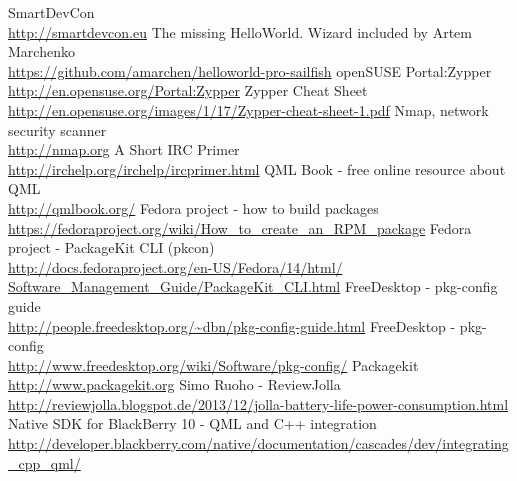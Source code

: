 \begin{thebibliography}{xxxxxxxxxxxx}
%
%
 SmartDevCon \\\url{http://smartdevcon.eu}
%
%
 The missing HelloWorld. Wizard included by Artem Marchenko \\\url{https://github.com/amarchen/helloworld-pro-sailfish}
%
%
 openSUSE Portal:Zypper \\\url{http://en.opensuse.org/Portal:Zypper}
 Zypper Cheat Sheet \\\url{http://en.opensuse.org/images/1/17/Zypper-cheat-sheet-1.pdf}
%
%
 Nmap, network security scanner \\\url{http://nmap.org}
%
%
 A Short IRC Primer \\\url{http://irchelp.org/irchelp/ircprimer.html}
%
%
 QML Book - free online resource about QML\\\url{http://qmlbook.org/}
%
%
 Fedora project - how to build packages \\\url{https://fedoraproject.org/wiki/How_to_create_an_RPM_package}
 Fedora project - PackageKit CLI (pkcon) \\\url{http://docs.fedoraproject.org/en-US/Fedora/14/html/
Software_Management_Guide/PackageKit_CLI.html}
%
%
 FreeDesktop - pkg-config guide \\\url{http://people.freedesktop.org/~dbn/pkg-config-guide.html}
 FreeDesktop - pkg-config \\\url{http://www.freedesktop.org/wiki/Software/pkg-config/}
 Packagekit \\\url{http://www.packagekit.org}
%
%
 Simo Ruoho - ReviewJolla \\\url{http://reviewjolla.blogspot.de/2013/12/jolla-battery-life-power-consumption.html}
%
%
 Native SDK	for BlackBerry 10 - QML and C++ integration \\\url{http://developer.blackberry.com/native/documentation/cascades/dev/integrating_cpp_qml/}
%
%
\end{thebibliography}
